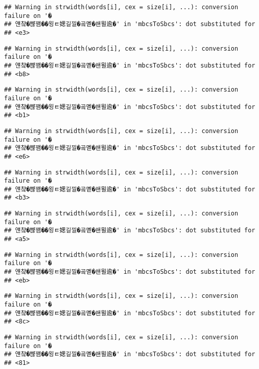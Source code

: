\documentclass[]{article}
\begin{document}
\begin{verbatim}
## Warning in strwidth(words[i], cex = size[i], ...): conversion failure on '�
## 얜챸�뺞꽴��욍ㅌ媤길낄�곸몓�쇈묄逾�' in 'mbcsToSbcs': dot substituted for
## <e3>
\end{verbatim}

\begin{verbatim}
## Warning in strwidth(words[i], cex = size[i], ...): conversion failure on '�
## 얜챸�뺞꽴��욍ㅌ媤길낄�곸몓�쇈묄逾�' in 'mbcsToSbcs': dot substituted for
## <b8>
\end{verbatim}

\begin{verbatim}
## Warning in strwidth(words[i], cex = size[i], ...): conversion failure on '�
## 얜챸�뺞꽴��욍ㅌ媤길낄�곸몓�쇈묄逾�' in 'mbcsToSbcs': dot substituted for
## <b1>
\end{verbatim}

\begin{verbatim}
## Warning in strwidth(words[i], cex = size[i], ...): conversion failure on '�
## 얜챸�뺞꽴��욍ㅌ媤길낄�곸몓�쇈묄逾�' in 'mbcsToSbcs': dot substituted for
## <e6>
\end{verbatim}

\begin{verbatim}
## Warning in strwidth(words[i], cex = size[i], ...): conversion failure on '�
## 얜챸�뺞꽴��욍ㅌ媤길낄�곸몓�쇈묄逾�' in 'mbcsToSbcs': dot substituted for
## <b3>
\end{verbatim}

\begin{verbatim}
## Warning in strwidth(words[i], cex = size[i], ...): conversion failure on '�
## 얜챸�뺞꽴��욍ㅌ媤길낄�곸몓�쇈묄逾�' in 'mbcsToSbcs': dot substituted for
## <a5>
\end{verbatim}

\begin{verbatim}
## Warning in strwidth(words[i], cex = size[i], ...): conversion failure on '�
## 얜챸�뺞꽴��욍ㅌ媤길낄�곸몓�쇈묄逾�' in 'mbcsToSbcs': dot substituted for
## <eb>
\end{verbatim}

\begin{verbatim}
## Warning in strwidth(words[i], cex = size[i], ...): conversion failure on '�
## 얜챸�뺞꽴��욍ㅌ媤길낄�곸몓�쇈묄逾�' in 'mbcsToSbcs': dot substituted for
## <8c>
\end{verbatim}

\begin{verbatim}
## Warning in strwidth(words[i], cex = size[i], ...): conversion failure on '�
## 얜챸�뺞꽴��욍ㅌ媤길낄�곸몓�쇈묄逾�' in 'mbcsToSbcs': dot substituted for
## <81>
\end{verbatim}
\end{document}
